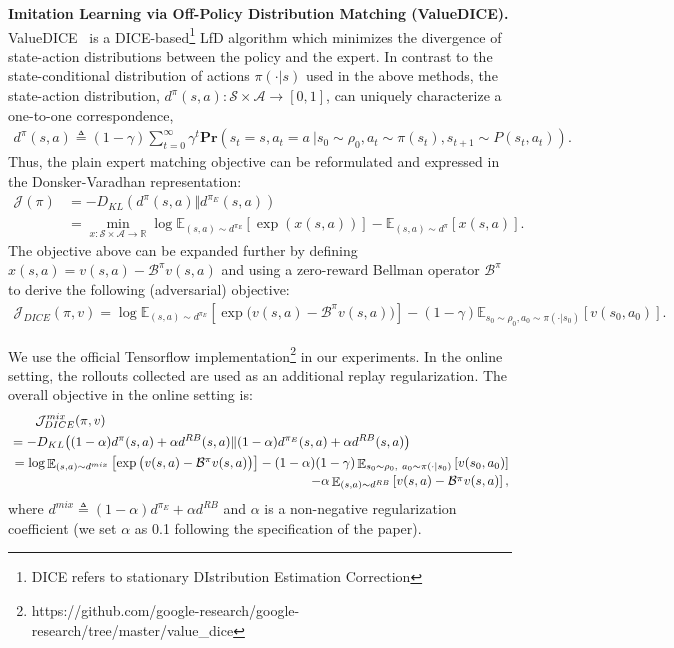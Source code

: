 \textbf{Imitation Learning via Off-Policy Distribution Matching (ValueDICE).} 
ValueDICE~\citep{kostrikov2019imitation} is a DICE-based\footnote{DICE refers to stationary DIstribution Estimation Correction} LfD algorithm which minimizes the divergence of state-action distributions between the policy and the expert. In contrast to the state-conditional distribution of actions $\pi(\cdot \vert s)$ used in the above methods, the state-action distribution, $d^\pi(s, a):\mathcal{S}\times\mathcal{A} \rightarrow \left[ 0,1 \right]$, can uniquely characterize a one-to-one correspondence, 
\begin{align}
d^\pi(s,a) \triangleq (1-\gamma) \sum_{t=0}^{\infty} \gamma^t \textbf{Pr}(s_t=s,a_t=a \ \vert s_0 \sim \rho_0,a_t \sim \pi(s_t), s_{t+1} \sim P(s_t, a_t) ). \nonumber
\end{align}
Thus, the plain expert matching objective can be reformulated and expressed in the Donsker-Varadhan representation:
\begin{align}
\mathcal{J}(\pi)&=-D_{KL}(d^\pi(s,a) \Vert d^{\pi_E}(s,a)) \nonumber \\
&=\min_{x:\mathcal{S}\times\mathcal{A} \rightarrow \mathbb{R}} \log \mathbb{E}_{(s,a) \sim d^{\pi_E}} \left[ \exp(x(s,a)) \right]
-\mathbb{E}_{(s,a) \sim d^{\pi}} \left[ x(s,a) \right]. \nonumber
\end{align}
The objective above can be expanded further by defining $x(s, a)=v(s, a)-\mathcal{B}^\pi v(s, a)$ and using a zero-reward Bellman operator $\mathcal{B}^\pi$ to derive the following (adversarial) objective:
\begin{align}
\mathcal{J}_{DICE}(\pi, v)=
\log\mathbb{E}_{(s,a)\sim d^{\pi_E}}\left[ \exp\big(v(s,a)-\mathcal{B}^\pi v(s,a)\big) \right]
-(1-\gamma) \mathbb{E}_{s_0 \sim \rho_0, a_0 \sim \pi(\cdot \vert s_0)} \left[ v(s_0, a_0) \right]. \nonumber
\end{align} 

We use the official Tensorflow implementation\footnote{https://github.com/google-research/google-research/tree/master/value\_dice} in our experiments. In the online setting, the rollouts collected are used as an additional replay regularization. The overall objective in the online setting is:
\begin{align}
& \  \ \ \ \ \  \mathcal{J}_{DICE}^{mix}(\pi, v) \nonumber \\
&= -D_{KL}\big((1-\alpha)d^{\pi}(s,a)+\alpha d^{RB}(s,a) \Vert (1-\alpha)d^{\pi_E}(s,a)+\alpha d^{RB}(s,a)\big) \nonumber\\
&=\log \mathop{\mathbb{E}}_{(s,a)\sim d^{mix}}\left[ \exp\big(v(s,a)-\mathcal{B}^\pi v(s,a)\big) \right]
-(1-\alpha)(1-\gamma)  \mathop{\mathbb{E}}_{s_0 \sim \rho_0, \  a_0 \sim \pi(\cdot \vert s_0)} \left[ v(s_0, a_0) \right]
\atop \hfill -\alpha \mathop{\mathbb{E}}_{(s,a) \sim d^{RB}} \left[ v(s, a) - \mathcal{B}^\pi v(s,a) \right], \nonumber
\end{align} 
where $d^{mix} \triangleq (1-\alpha)d^{\pi_E}+\alpha d^{RB}$ and $\alpha$ is a non-negative regularization coefficient (we set $\alpha$ as 0.1 following the specification of the paper).

